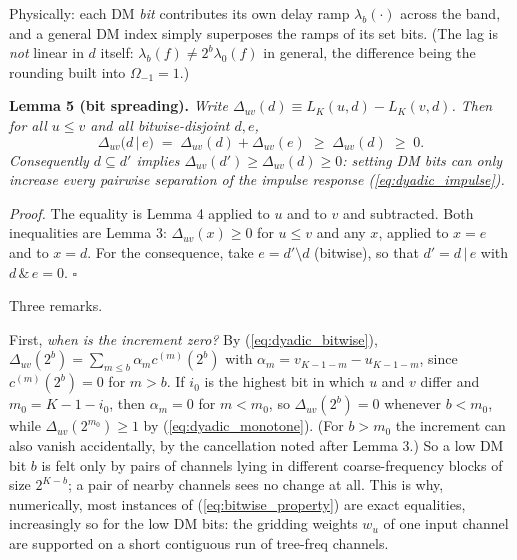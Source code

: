 \documentclass{article}
\numberwithin{equation}{section}   %
\begin{document}
\medskip
\par\noindent
Physically: each DM {\em bit} contributes its own delay ramp $\lambda_b(\cdot)$ across the
band, and a general DM index simply superposes the ramps of its set bits. (The lag is
{\em not} linear in $d$ itself: $\lambda_b(f) \ne 2^b \lambda_0(f)$ in general, the difference
being the rounding built into $\Omega_{-1}=1$.)

\medskip
\par\noindent
{\bf Lemma 5 (bit spreading).}
{\em Write $\Delta_{uv}(d) \equiv L_K(u,d) - L_K(v,d)$. Then for all $u \le v$ and all
bitwise-disjoint $d, e$,}
\begin{equation}
\Delta_{uv}\big( d \,|\, e \big) \;=\; \Delta_{uv}(d) + \Delta_{uv}(e) \;\ge\; \Delta_{uv}(d)
  \;\ge\; 0 .
\label{eq:dyadic_spread}
\end{equation}
{\em Consequently $d \subseteq d'$ implies $\Delta_{uv}(d') \ge \Delta_{uv}(d) \ge 0$: setting
DM bits can only increase every pairwise separation of the impulse response
(\ref{eq:dyadic_impulse}).}

\medskip
\par\noindent
{\em Proof.} The equality is Lemma 4 applied to $u$ and to $v$ and subtracted. Both
inequalities are Lemma 3: $\Delta_{uv}(x) \ge 0$ for $u \le v$ and any $x$, applied to
$x = e$ and to $x = d$. For the consequence, take $e = d' \setminus d$ (bitwise), so that
$d' = d \,|\, e$ with $d \,\&\, e = 0$. $\square$

\medskip
\par\noindent
Three remarks.

First, {\em when is the increment zero?} By (\ref{eq:dyadic_bitwise}),
$\Delta_{uv}(2^b) = \sum_{m \le b} \alpha_m c^{(m)}(2^b)$ with
$\alpha_m = v_{K-1-m}-u_{K-1-m}$, since $c^{(m)}(2^b) = 0$ for $m > b$. If $i_0$ is the
highest bit in which $u$ and $v$ differ and $m_0 = K-1-i_0$, then $\alpha_m = 0$ for $m<m_0$,
so $\Delta_{uv}(2^b) = 0$ whenever $b < m_0$, while $\Delta_{uv}(2^{m_0}) \ge 1$ by
(\ref{eq:dyadic_monotone}). (For $b > m_0$ the increment can also vanish accidentally, by the
cancellation noted after Lemma 3.) So a low DM bit $b$ is felt only by pairs of channels lying
in different coarse-frequency blocks of size $2^{K-b}$; a pair of nearby channels sees no
change at all. This is why, numerically, most instances of (\ref{eq:bitwise_property}) are
exact equalities, increasingly so for the low DM bits: the gridding weights $w_u$ of one input
channel are supported on a short contiguous run of tree-freq channels.
\end{document}
